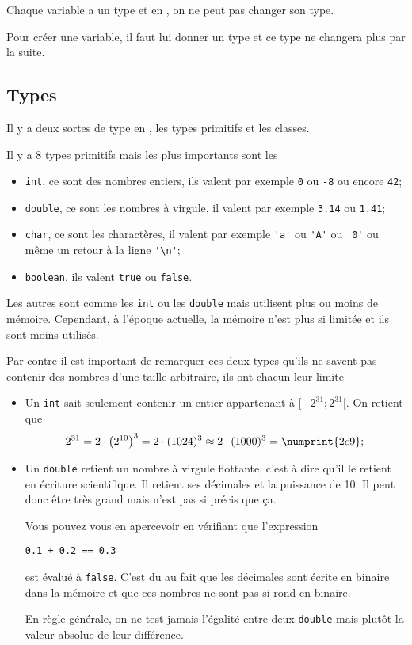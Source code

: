 Chaque variable a un type et en \java{}, on ne peut pas changer son type.

Pour créer une variable, il faut lui donner un type et ce type ne changera
plus par la suite.
\subsection{Types}
Il y a deux sortes de type en \java{}, les types primitifs et les classes.

Il y a 8 types primitifs mais les plus importants sont les
\begin{itemize}
  \item \lstinline|int|, ce sont des nombres entiers, ils valent par exemple
    \lstinline|0| ou \lstinline|-8| ou encore \lstinline|42|;
  \item \lstinline|double|, ce sont les nombres à virgule, il valent par exemple
    \lstinline|3.14| ou \lstinline|1.41|;
  \item \lstinline|char|, ce sont les charactères,
    il valent par exemple \lstinline|'a'|
    ou \lstinline|'A'| ou \lstinline|'0'| ou
    même un retour à la ligne \lstinline|'\n'|;
  \item \lstinline|boolean|, ils valent \lstinline|true| ou \lstinline|false|.
\end{itemize}
Les autres sont comme les \lstinline|int| ou les \lstinline|double|
mais utilisent plus
ou moins de mémoire. Cependant, à l'époque actuelle, la mémoire n'est plus
si limitée et ils sont moins utilisés.

Par contre il est important de remarquer ces deux types qu'ils ne savent
pas contenir des nombres d'une taille arbitraire, ils ont chacun leur limite
\begin{itemize}
  \item Un \lstinline|int| sait seulement contenir un entier appartenant à
    $[-2^{31}; 2^{31}[$. On retient que
    \[ 2^{31} = 2 \cdot \left(2^{10}\right)^3 = 2 \cdot (1024)^3
    \approx 2 \cdot (1000)^3 = \numprint{2e9}; \]
  \item Un \lstinline|double| retient un nombre à virgule flottante,
    c'est à dire
    qu'il le retient en écriture scientifique.
    Il retient ses décimales et la puissance de 10.
    Il peut donc être très grand mais n'est pas si précis que ça.

    Vous pouvez vous en apercevoir en vérifiant que l'expression
    \begin{lstlisting}
0.1 + 0.2 == 0.3
    \end{lstlisting}
    est évalué à \lstinline|false|.
    C'est du au fait que les décimales sont écrite en binaire dans la mémoire
    et que ces nombres ne sont pas si rond en binaire.

    En règle générale, on ne test jamais l'égalité entre deux \lstinline|double|
    mais plutôt la valeur absolue de leur différence.
\end{itemize}

